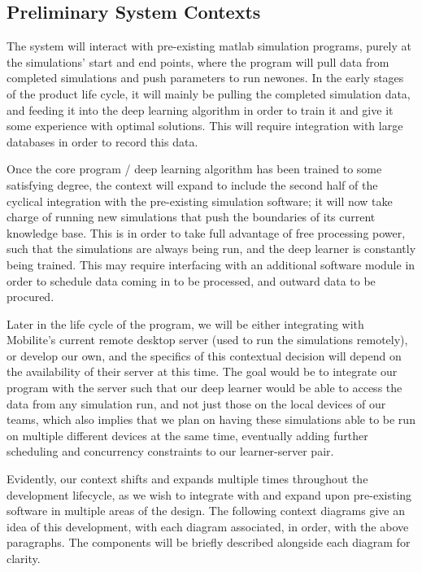 \documentclass[12pt, titlepage]{article}
\begin{document}
\subsection{Preliminary System Contexts}
The system will interact with pre-existing matlab simulation programs, purely at the simulations’ start and end points, where the program will pull data from completed simulations and push parameters to run newones. In the early stages of the product life cycle, it will mainly be pulling the completed simulation data, and feeding it into the deep learning algorithm in order to train it and give it some experience with optimal solutions. This will require integration with large databases in order to record this data. 
\par
Once the core program / deep learning algorithm has been trained to some satisfying degree, the context will expand to include the second half of the cyclical integration with the pre-existing simulation software; it will now take charge of running new simulations that push the boundaries of its current knowledge base. This is in order to take full advantage of free processing power, such that the simulations are always being run, and the deep learner is constantly being trained. This may require interfacing with an additional software module  in order to schedule data coming in to be processed, and outward data to be procured. 
\par
Later in the life cycle of the program, we will be either integrating with Mobilite’s current remote desktop server (used to run the simulations remotely), or develop our own, and the specifics of this contextual decision will depend on the availability of their server at this time. The goal would be to integrate our program with the server such that our deep learner would be able to access the data from any simulation run, and not just those on the local devices of our teams, which also implies that we plan on having these simulations able to be run on multiple different devices at the same time, eventually adding further scheduling and concurrency constraints to our learner-server pair. 
\par
Evidently, our context shifts and expands multiple times throughout the development lifecycle, as we wish to integrate with and expand upon pre-existing software in multiple areas of the design. The following context diagrams give an idea of this development, with each diagram associated, in order, with the above paragraphs. The components will be briefly described alongside each diagram for clarity.
\end{document}
